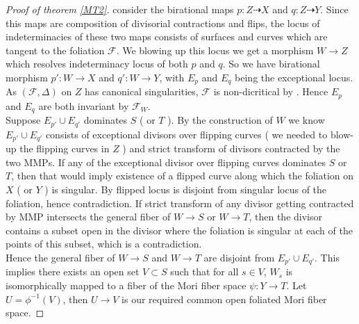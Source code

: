 \documentclass[12pt]{amsart}%
\theoremstyle{plain}
\theoremstyle{remark}
\theoremstyle{definition}
\newcommand{\<}{\leq}
\theoremstyle{definition}
\theoremstyle{definition}
\numberwithin{equation}{section}
\theoremstyle{remark}
\begin{document}
\begin{proof}[Proof of theorem \ref{MT2}]
   consider the birational maps $p:Z\dashrightarrow X$ and $q:Z\dashrightarrow Y$. Since this maps are composition of divisorial contractions and flips, the locus of indeterminacies of these two maps consists of surfaces and curves which are tangent to the foliation $\mathcal{F}$. We blowing up this locus we get a morphism $W\rightarrow Z$ which resolves indeterminacy locus of both $p$ and $q$. So we have birational morphism $p':W\rightarrow X$ and $q':W\rightarrow Y$, with $E_p$ and $E_q$ being the exceptional locus. As $(\mathcal{F},\Delta)$ on $Z$ has canonical singularities, $\mathcal{F}$ is non-dicritical by \cite[Corrollary III.i.4 ]{MP13}. Hence $E_p$ and $E_q$ are both invariant by $\mathcal{F}_W$.\\
  Suppose $E_{p'}\cup E_{q'}$ dominates $S$ ( or $T$ ). By the construction of $W$ we know $E_{p'}\cup E_{q'}$ consists of exceptional divisors over flipping curves ( we needed to blow-up the flipping curves in $Z$ ) and strict transform of divisors contracted by the two MMPs. If any of the exceptional divisor over flipping curves dominates $S$ or $T$, then that would imply existence of a flipped curve along which the foliation on $X$ ( or $Y$ ) is singular. By \cite{CS20} flipped locus is disjoint from singular locus of the foliation, hence contradiction. If strict transform of any divisor getting contracted by MMP intersects the general fiber of $W\rightarrow S$ or $W\rightarrow T$, then the divisor contains a subset open in the divisor where the foliation is singular at each of the points of this subset, which is a contradiction.\\
  Hence the general fiber of $W\rightarrow S$ and $W\rightarrow T$ are disjoint from $E_{p'}\cup E_{q'}$. This implies there exists an open set $V\subset S$ such that for all $s\in V$, $W_s$ is isomorphically mapped to a fiber of the Mori fiber space $\psi:Y\rightarrow T$. Let $U=\phi^{-1}(V)$, then $U\rightarrow V$ is our required common open foliated Mori fiber space.
\end{proof}
\end{document}
